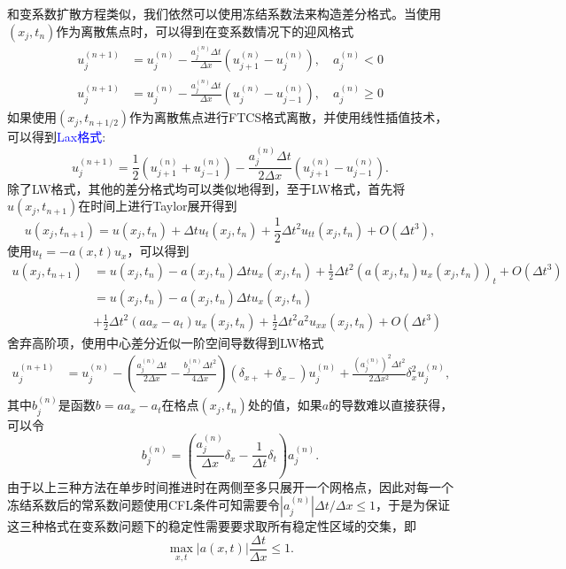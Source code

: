 \documentclass[a4paper,10pt]{ctexart}
\begin{document}
和变系数扩散方程类似，我们依然可以使用冻结系数法来构造差分格式。当使用$ (x_j,t_n) $作为离散焦点时，可以得到在变系数情况下的迎风格式
\begin{equation}
    \begin{aligned}
        u^{(n+1)}_j &= u^{(n)}_j - \frac{a_{j}^{(n)}\Delta t}{\Delta x}(u^{(n)}_{j+1}-u^{(n)}_j), \quad a_j^{(n)} <0\\
        u^{(n+1)}_j &= u^{(n)}_j - \frac{a_{j}^{(n)}\Delta t}{\Delta x}(u^{(n)}_{j}-u^{(n)}_{j-1}), \quad a_j^{(n)} \geqslant 0
    \end{aligned}
\end{equation}
如果使用$ (x_j,t_{n+1 / 2}) $作为离散焦点进行FTCS格式离散，并使用线性插值技术，可以得到\textcolor{blue}{Lax格式}:
\begin{equation}
    u^{(n+1)}_j = \frac{1}{2}(u^{(n)}_{j+1}+u^{(n)}_{j-1}) - \frac{a_{j}^{(n)}\Delta t}{2\Delta x}(u^{(n)}_{j+1}-u^{(n)}_{j-1}).
\end{equation}
除了LW格式，其他的差分格式均可以类似地得到，至于LW格式，首先将$ u(x_j,t_{n+1}) $在时间上进行Taylor展开得到
\[
    u(x_j,t_{n+1}) = u(x_j,t_n) + \Delta t u_t(x_j,t_n) + \frac{1}{2}\Delta t^2 u_{tt}(x_j,t_n) + O(\Delta t^3),
\]
使用$ u_t = -a(x,t)u_x $，可以得到
\[
    \begin{aligned}
        u(x_j,t_{n+1}) 
        &= u(x_j,t_n) - a(x_j,t_n)\Delta t u_x(x_j,t_n) + \frac{1}{2}\Delta t^2 (a(x_j,t_n)u_{x}(x_j,t_n))_t + O(\Delta t^3)\\
        &= u(x_j,t_n) - a(x_j,t_n)\Delta t u_x(x_j,t_n) \\
        &+ \frac{1}{2}\Delta t^2 (aa_x-a_t)u_x(x_j,t_n) + \frac{1}{2}\Delta t^2 a^2u_{xx}(x_j,t_n) + O(\Delta t^3)
    \end{aligned}
\]
舍弃高阶项，使用中心差分近似一阶空间导数得到LW格式
\begin{equation}
    \begin{aligned}
        u^{(n+1)}_j 
        &= u^{(n)}_j - \left( \frac{a^{(n)}_j\Delta t}{2\Delta x} - \frac{b_j^{(n)}\Delta t^2}{4\Delta x} \right) (\delta_{x+}+\delta_{x-}) u^{(n)}_{j}+ \frac{(a^{(n)}_j)^2\Delta t^2}{2\Delta x^2}\delta_x^2 u^{(n)}_j,
    \end{aligned}
\end{equation}
其中$ b_j^{(n)} $是函数$ b = aa_x-a_t $在格点$ (x_j,t_n) $处的值，如果$ a $的导数难以直接获得，可以令
\[
    b^{(n)}_j =(\frac{a^{(n)}_j}{\Delta x}\delta_x-\frac{1}{\Delta t}\delta_t) a_{j}^{(n)}.
\]
由于以上三种方法在单步时间推进时在两侧至多只展开一个网格点，因此对每一个冻结系数后的常系数问题使用CFL条件可知需要令$ |a^{(n)}_j| \Delta t / \Delta x\leqslant 1 $，于是为保证这三种格式在变系数问题下的稳定性需要要求取所有稳定性区域的交集，即
\begin{equation}
    \max_{x,t}|a(x,t)| \frac{\Delta t}{\Delta x} \leqslant 1.
\end{equation}
\end{document}
